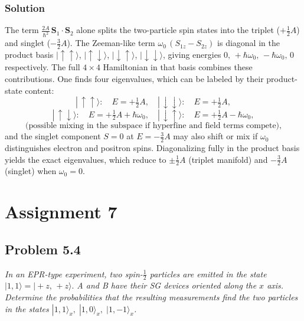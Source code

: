 \documentclass[twocolumn]{article}
\begin{document}
\begin{spacing}{1}
\subsubsection*{Solution}
The term
\(
\frac{2A}{\hbar^2}\,\mathbf{S}_1 \cdot \mathbf{S}_2
\)
alone splits the two-particle spin states into the triplet ($+\tfrac12 A$) and singlet ($-\tfrac32 A$). The Zeeman-like term 
\(
\omega_0\,(S_{1z}-S_{2z})
\)
is diagonal in the product basis $|\uparrow\uparrow\rangle$, $|\uparrow\downarrow\rangle$, $|\downarrow\uparrow\rangle$, $|\downarrow\downarrow\rangle$, giving energies $0,\,+\hbar\omega_0,\,-\hbar\omega_0,\,0$ respectively. The full $4\times 4$ Hamiltonian in that basis combines these contributions. One finds four eigenvalues, which can be labeled by their product-state content:
\[
|\,\uparrow\uparrow\rangle:\quad E = +\tfrac12 A,
\quad
|\,\downarrow\downarrow\rangle:\quad E = +\tfrac12 A,
\]
\[
|\,\uparrow\downarrow\rangle:\quad E = +\tfrac12 A + \hbar\omega_0,
\quad
|\,\downarrow\uparrow\rangle:\quad E = +\tfrac12 A - \hbar\omega_0,
\]
\[
\text{(possible mixing in the subspace if hyperfine and field terms compete),}
\]
and the singlet component $S=0$ at $E=-\tfrac32 A$ may also shift or mix if $\omega_0$ distinguishes electron and positron spins. Diagonalizing fully in the product basis yields the exact eigenvalues, which reduce to $\pm \tfrac12 A$ (triplet manifold) and $-\tfrac32 A$ (singlet) when $\omega_0=0$.

\section{Assignment 7}

\subsection{Problem 5.4}
\textit{In an EPR-type experiment, two spin-$\tfrac12$ particles are emitted in the state 
\(
|1,1\rangle = |+z,\,+z\rangle.
\)
A and B have their SG devices oriented along the $x$ axis. Determine the probabilities that the resulting measurements find the two particles in the states 
\(
|1,1\rangle_x,\;|1,0\rangle_x,\;|1,-1\rangle_x
\).}


\end{spacing}
\end{document}
